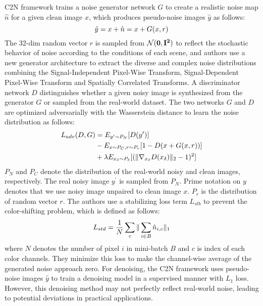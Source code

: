 \documentclass[conference]{IEEEtran}
\begin{document}
C2N \cite{jang2021c2n} framework trains a noise generator network $G$ to create a realistic noise map $\hat{n}$ for a given clean image $x$, which produces pseudo-noise images $\hat{y}$ as follows:
\begin{equation}
	\setlength{\abovedisplayskip}{0pt}
	\setlength{\belowdisplayskip}{0pt}
	\hat{y} = x+ \hat{n} = x+ G(x,r)
	\label{eq:C2N_1}
\end{equation}
The 32-dim random vector $r$ is sampled from $\mathcal{N}(\bf{0}, \bf{I^2})$ to reflect the stochastic behavior of noise according to the conditions of each scene, and authors use a new generator architecture to extract the diverse and complex noise  distributions combining the Signal-Independent Pixel-Wise Transform, Signal-Dependent Pixel-Wise Transform and Spatially Correlated Transforms.
A discriminator network $D$ distinguishes whether a given noisy image is synthesized from the generator $G$ or sampled from the real-world dataset. The two networks $G$ and $D$ are optimized adversarially with the Wasserstein distance \cite{gulrajani2017improved} to learn the noise distribution as follows:
\begin{equation}
	\setlength{\abovedisplayskip}{0pt}
	\setlength{\belowdisplayskip}{0pt}
	\begin{aligned}
		L_{adv}(D,G) &=E_{y^{\prime} \sim P_N}[D(y^{\prime})] \\
		&-E_{x\sim P_C, r \sim P_r}[1-D(x+G(x,r))] \\
		&+ \lambda E_{x_{\delta}\sim P_{\delta}}[(\Vert \nabla_{x_{\delta}} D(x_{\delta})\Vert_2 -1)^2]
	\end{aligned}
	\label{eq:C2N_2}
\end{equation}
$P_N$ and $P_C$ denote the distribution of the real-world noisy and clean images, respectively. The real noisy image $y^{\prime}$ is sampled from $P_N$. Prime notation on $y$ denotes that we use noisy image unpaired to clean image $x$. $P_r$ is the distribution of random vector $r$.
The authors use a stabilizing loss term $L_{stb}$ to prevent the color-shifting problem, which is defined as follows:
\begin{equation}
	\setlength{\abovedisplayskip}{0pt}
	\setlength{\belowdisplayskip}{0pt}
	L_{std} = \frac{1}{N}\sum \limits_{c} \Vert \sum\limits_{i \in B}{\hat{n}_{i,c} \Vert_1}
	\label{eq:C2N_3}
\end{equation}
where $N$ denotes the number of pixel $i$ in mini-batch $B$ and $c$ is index of each color channels. They minimize this loss to make the channel-wise average of the generated noise approach zero. 
For denoising, the C2N framework uses pseudo-noise images $\hat{y}$ to train a denoising model in a supervised manner with $L_1$ loss. However, this denoising method may not perfectly reflect real-world noise, leading to potential deviations in practical applications.
\end{document}
